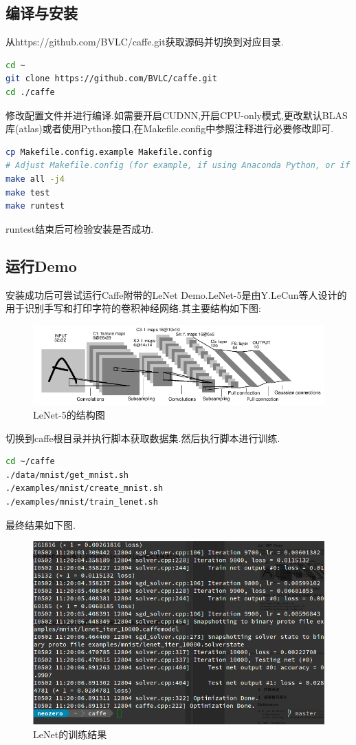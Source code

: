 \documentclass[a4paper]{article}
\begin{document}
	\subsection{编译与安装}
	从https://github.com/BVLC/caffe.git获取源码并切换到对应目录.
	\begin{lstlisting}[language=bash]
cd ~
git clone https://github.com/BVLC/caffe.git
cd ./caffe
	\end{lstlisting}
	修改配置文件并进行编译.如需要开启CUDNN,开启CPU-only模式,更改默认BLAS库(atlas)或者使用Python接口,在Makefile.config中参照注释进行必要修改即可.
	\begin{lstlisting}[language=bash]
cp Makefile.config.example Makefile.config
# Adjust Makefile.config (for example, if using Anaconda Python, or if cuDNN is desired)
make all -j4
make test
make runtest
	\end{lstlisting}
	runtest结束后可检验安装是否成功.
	\subsection{运行Demo}
	安装成功后可尝试运行Caffe附带的LeNet Demo.LeNet-5\cite{lecun2015lenet}是由Y.LeCun等人设计的用于识别手写和打印字符的卷积神经网络.其主要结构如下图:
	\begin{figure}[H]
		\centering
		\includegraphics[width=\linewidth]{lenet5.png}
		\caption{LeNet-5的结构图}
		\label{lenet5}
	\end{figure}
	切换到caffe根目录并执行脚本获取数据集.然后执行脚本进行训练.
	\begin{lstlisting}[language=bash]
cd ~/caffe
./data/mnist/get_mnist.sh
./examples/mnist/create_mnist.sh
./examples/mnist/train_lenet.sh
	\end{lstlisting}
	最终结果如下图.
	\begin{figure}[H]
		\centering
		\includegraphics[width=\linewidth]{lenetresult.png}
		\caption{LeNet的训练结果}
		\label{training}
	\end{figure}
	
\end{document}
